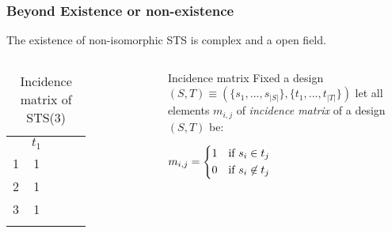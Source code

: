 \begin{frame}
	\frametitle{Beyond Existence or non-existence}
	
	\begin{block}{}
		The existence of non-isomorphic STS is complex and a open field.
	\end{block}

\begin{columns}
\begin{table}[]
\begin{tabular}{cccll}
\cline{1-2}
\multicolumn{1}{|c|}{} & \multicolumn{1}{c|}{$t_1$}  &  &  \\ \cline{1-2}
\multicolumn{1}{|c|}{1} & \multicolumn{1}{c|}{1}  &  &  \\ \cline{1-2}
\multicolumn{1}{|c|}{2} & \multicolumn{1}{c|}{1}  &  &  \\ \cline{1-2}
\multicolumn{1}{|c|}{3} & \multicolumn{1}{c|}{1}   &  \\ \cline{1-2}
\multicolumn{1}{l}{}    & \multicolumn{1}{l}{}      &  & 
\end{tabular}
\caption{Incidence matrix of STS(3)}
\end{table}	
\begin{block}{Incidence matrix}
Fixed a design $(S,T) \equiv (\{s_1, ..., s_{|S|} \},\{t_1, ..., t_{|T|} \})$ let all elements $m_{i,j}$ of \textit{incidence matrix} of a design $(S,T)$ be:

\begin{math}
m_{i,j} = 
\begin{cases*}
1 & if $s_i \in t_j$\\
0 & if $s_i \not \in t_j$
\end{cases*}
\end{math}

\end{block}
\end{columns}


\end{frame}

